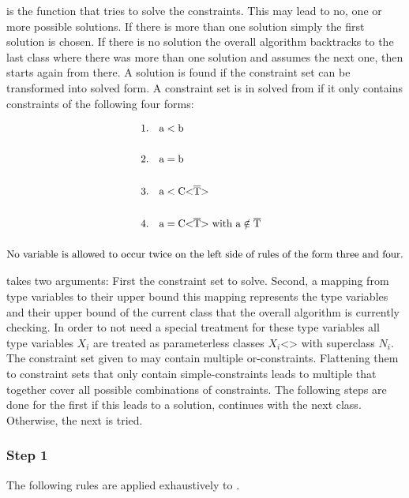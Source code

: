  is the function that tries to solve the constraints. This may lead to no, one or more possible solutions. If there is more than one solution simply the first solution is chosen. If there is no solution the overall algorithm backtracks to the last class where there was more than one solution and assumes the next one, then starts again from there.
A solution is found if the constraint set can be transformed into solved form. A constraint set is in solved from if it only contains constraints of the following four forms:

\begin{align*}
    1.& \quad \text{a} < \text{b}\\
    \\
    2.& \quad \text{a} = \text{b}\\
    \\
    3.& \quad \text{a} < \text{C<} \ot{T} \text{>}\\
    \\
    4.& \quad \text{a} = \text{C<} \ot{T} \text{>} \ \text{with a} \notin \ot{T}\\
    \\
    \text{No variable is allowed to occur } & \text{twice on the left side of rules of the form three and four.}
\end{align*}

 takes two arguments: First the constraint set to solve. Second, a mapping from type variables  to their upper bound  this mapping represents the type variables and their upper bound of the current class that the overall algorithm is currently checking.
In order to not need a special treatment for these type variables all type variables $X_i$ are treated as parameterless classes $X_i$<> with superclass $N_i$.
The constraint set  given to  may contain multiple or-constraints. Flattening them to constraint sets  that only contain simple-constraints leads to multiple  that together cover all possible combinations of constraints.
The following steps are done for the first  if this leads to a solution,  continues with the next class. Otherwise, the next  is tried.

\subsubsection{Step 1}
The following rules are applied exhaustively to .

